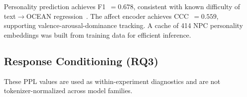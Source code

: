 \documentclass[11pt]{article}
\begin{document}
Personality prediction achieves F1~$=0.678$, consistent with known difficulty of text$\to$OCEAN regression~\cite{mairesse2007using}.
The affect encoder achieves CCC~$=0.559$, supporting valence-arousal-dominance tracking.
A cache of 414 NPC personality embeddings was built from training data for efficient inference.

\subsection{Response Conditioning (RQ3)}

\begin{table}[t]
\centering
\caption{Response generation comparison. \textbf{Bold}: best PPL. The soft-prefix gain is $12.3\%$, but placebo ablations show this gain is not attributable to the semantic content of OCEAN+VAD values. ConditionalDialogue reports mean across 3 seeds (42--44).}
\label{tab:response_ppl}
\small
{}
\end{table}

These PPL values are used as within-experiment diagnostics and are not tokenizer-normalized across model families.
\end{document}
